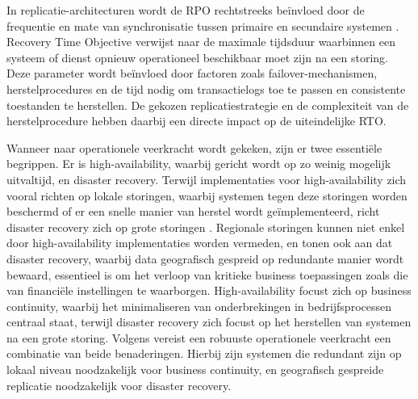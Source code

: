 In replicatie-architecturen wordt de RPO rechtstreeks beïnvloed door de frequentie en mate van synchronisatie tussen primaire en secundaire systemen \autocite{swanson2010contingency}.
Recovery Time Objective verwijst naar de maximale tijdsduur waarbinnen een systeem of dienst opnieuw operationeel beschikbaar moet zijn na een storing. 
Deze parameter wordt beïnvloed door factoren zoals failover-mechanismen, herstelprocedures en de tijd nodig om transactielogs toe te passen en consistente toestanden te herstellen.
De gekozen replicatiestrategie en de complexiteit van de herstelprocedure hebben daarbij een directe impact op de uiteindelijke RTO\@.

Wanneer naar operationele veerkracht wordt gekeken, zijn er twee essentiële begrippen.
Er is high-availability, waarbij gericht wordt op zo weinig mogelijk uitvaltijd, en disaster recovery.
Terwijl implementaties voor high-availability zich vooral richten op lokale storingen, waarbij systemen tegen deze storingen worden beschermd of er een snelle manier van herstel wordt geïmplementeerd, richt disaster recovery zich op grote storingen \autocite{schmidt2006high}.
Regionale storingen kunnen niet enkel door high-availability implementaties worden vermeden, en tonen ook aan dat disaster recovery, waarbij data geografisch gespreid op redundante manier wordt bewaard, essentieel is om het verloop van kritieke business toepassingen zoals die van financiële instellingen te waarborgen.
High-availability focust zich op business continuity, waarbij het minimaliseren van onderbrekingen in bedrijfsprocessen centraal staat, terwijl disaster recovery zich focust op het herstellen van systemen na een grote storing.
Volgens \textcite{schmidt2006high} vereist een robuuste operationele veerkracht een combinatie van beide benaderingen.
Hierbij zijn systemen die redundant zijn op lokaal niveau noodzakelijk voor business continuity, en geografisch gespreide replicatie noodzakelijk voor disaster recovery.

\subsection{}%
\label{sec:operationele-veerkracht-regelgevingen}

